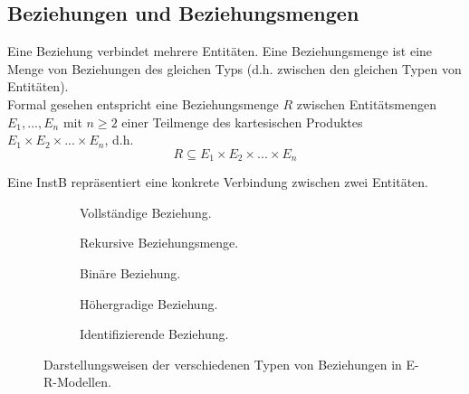 \subsection{Beziehungen und Beziehungsmengen}
Eine Beziehung verbindet mehrere Entitäten. Eine \Gls{Beziehungsmenge} ist eine Menge von Beziehungen des gleichen Typs (d.h. zwischen den gleichen Typen von Entitäten). \\ Formal gesehen entspricht eine Beziehungsmenge $R$ zwischen Entitätsmengen $E_1, ..., E_n$ mit $n \geq 2$ einer Teilmenge des kartesischen Produktes $E_1 \times E_2 \times ... \times E_n$, d.h.
\begin{equation*}
    R \subseteq E_1 \times E_2 \times ... \times E_n
\end{equation*}
\begin{mybox}[title=Instanz einer Beziehungsmenge]
Eine \Gls{InstB} repräsentiert eine konkrete Verbindung zwischen zwei Entitäten.
\end{mybox}

\begin{figure}[H]
    \centering
    \begin{subfigure}{0.3\textwidth}
    \caption{Vollständige Beziehung.}
    \label{fig:vollstB}
    \end{subfigure}
    \begin{subfigure}{0.3\textwidth}
    \caption{Rekursive Beziehungsmenge.}
    \label{fig:rekB}
    \end{subfigure}
    \begin{subfigure}{0.3\textwidth}
    \caption{Binäre Beziehung.}
    \label{fig:binB}
    \end{subfigure}
    \begin{subfigure}{0.3\textwidth}
    \caption{Höhergradige Beziehung.}
    \label{fig:höhB}
    \end{subfigure}
    \begin{subfigure}{0.3\textwidth}
    \caption{Identifizierende Beziehung.}
    \label{fig:identB}
    \end{subfigure}
    \caption{Darstellungsweisen der verschiedenen Typen von Beziehungen in E-R-Modellen.}
    \label{fig:beziehungen}
\end{figure} \noindent
